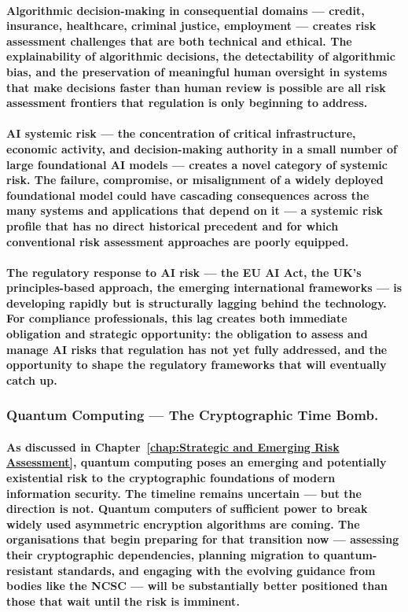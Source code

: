 \paragraph{\textbf{Algorithmic decision-making} in consequential domains — credit, insurance, healthcare, criminal justice, employment — creates risk assessment challenges that are both technical and ethical. The explainability of algorithmic decisions, the detectability of algorithmic bias, and the preservation of meaningful human oversight in systems that make decisions faster than human review is possible are all risk assessment frontiers that regulation is only beginning to address.}
\paragraph{\textbf{AI systemic risk} — the concentration of critical infrastructure, economic activity, and decision-making authority in a small number of large foundational AI models — creates a novel category of systemic risk. The failure, compromise, or misalignment of a widely deployed foundational model could have cascading consequences across the many systems and applications that depend on it — a systemic risk profile that has no direct historical precedent and for which conventional risk assessment approaches are poorly equipped.}
\paragraph{The regulatory response to AI risk — the EU AI Act, the UK's principles-based approach, the emerging international frameworks — is developing rapidly but is structurally lagging behind the technology. For compliance professionals, this lag creates both immediate obligation and strategic opportunity: the obligation to assess and manage AI risks that regulation has not yet fully addressed, and the opportunity to shape the regulatory frameworks that will eventually catch up.}
\subsubsection{Quantum Computing — The Cryptographic Time Bomb.}
\paragraph{As discussed in Chapter~\ref{chap:Strategic and Emerging Risk Assessment}, quantum computing poses an emerging and potentially existential risk to the cryptographic foundations of modern information security. The timeline remains uncertain — but the direction is not. Quantum computers of sufficient power to break widely used asymmetric encryption algorithms are coming. The organisations that begin preparing for that transition now — assessing their cryptographic dependencies, planning migration to quantum-resistant standards, and engaging with the evolving guidance from bodies like the NCSC — will be substantially better positioned than those that wait until the risk is imminent.}
